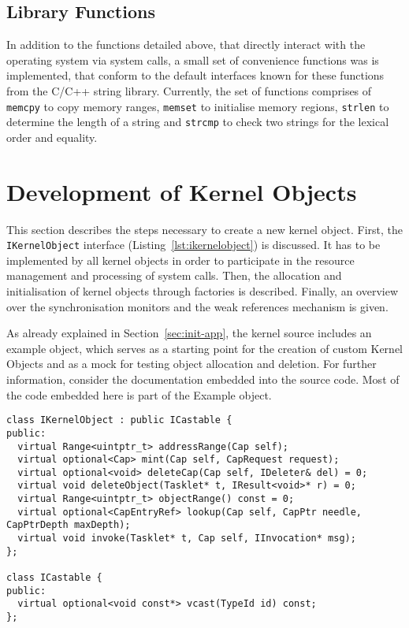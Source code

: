 \subsection{Library Functions} In addition to the functions detailed above, that
directly interact with the operating system via system calls, a small set of
convenience functions was is implemented, that conform to the default interfaces
known for these functions from the C/C++ string library. Currently, the set of
functions comprises of \texttt{memcpy} to copy memory ranges, \texttt{memset} to
initialise memory regions, \texttt{strlen} to determine the length of a string
and \texttt{strcmp} to check two strings for the lexical order and equality.

\section{Development of Kernel Objects}
\label{sec:kernel-objects}

This section describes the steps necessary to create a new kernel
object. First, the \texttt{IKernelObject} interface
(Listing~\ref{lst:ikernelobject}) is discussed. It has to be
implemented by all kernel objects in order to participate in the
resource management and processing of system calls.  Then, the
allocation and initialisation of kernel objects through factories is
described.  Finally, an overview over the synchronisation monitors and
the weak references mechanism is given.

As already explained in Section~\ref{sec:init-app}, the kernel source includes
an example object, which serves as a starting point for the creation of custom
Kernel Objects and as a mock for testing object allocation and deletion. For
further information, consider the documentation embedded into the source code.
Most of the code embedded here is part of the Example object.

\lstset{language=c++, numbers=left}
\begin{lstlisting}[float, label=lst:ikernelobject, caption=The \texttt{IKernelObject} interface.]
class IKernelObject : public ICastable {
public:
  virtual Range<uintptr_t> addressRange(Cap self);
  virtual optional<Cap> mint(Cap self, CapRequest request);
  virtual optional<void> deleteCap(Cap self, IDeleter& del) = 0;
  virtual void deleteObject(Tasklet* t, IResult<void>* r) = 0;
  virtual Range<uintptr_t> objectRange() const = 0;
  virtual optional<CapEntryRef> lookup(Cap self, CapPtr needle, CapPtrDepth maxDepth);
  virtual void invoke(Tasklet* t, Cap self, IInvocation* msg);
};

class ICastable {
public:
  virtual optional<void const*> vcast(TypeId id) const;
};
\end{lstlisting}

